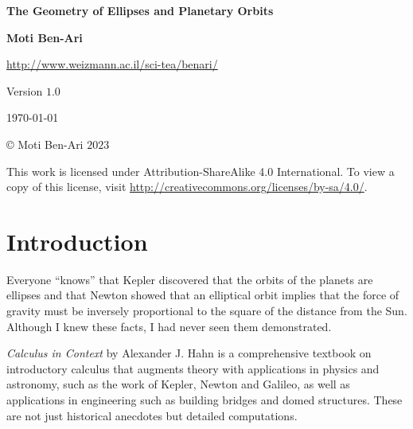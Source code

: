 


\thispagestyle{empty}

\begin{center}
\textbf{\LARGE The Geometry of Ellipses and Planetary Orbits}

\bigskip
\bigskip
\bigskip

\textbf{\Large Moti Ben-Ari}

\bigskip

\url{http://www.weizmann.ac.il/sci-tea/benari/}

\bigskip
\bigskip
\bigskip

Version $1.0$

\bigskip

\today

\end{center}

\vfill

\begin{center}
\copyright{} Moti Ben-Ari $2023$
\end{center}
 
\begin{small}
This work is licensed under Attribution-ShareAlike 4.0 International. To view a copy of this license, visit \url{http://creativecommons.org/licenses/by-sa/4.0/}.
\end{small}

\newpage

\tableofcontents

\newpage


\chapter{Introduction}

Everyone ``knows'' that Kepler discovered that the orbits of the planets are ellipses and that Newton showed that an elliptical orbit implies that the force of gravity must be inversely proportional to the square of the distance from the Sun. Although I knew these facts, I had never seen them demonstrated.

\textit{Calculus in Context} \cite{hahn-cic} by Alexander J. Hahn is a comprehensive textbook on introductory calculus that augments theory with  applications in physics and astronomy, such as the work of Kepler, Newton and Galileo, as well as applications in engineering such as building bridges and domed structures. These are not just historical anecdotes but detailed computations.

